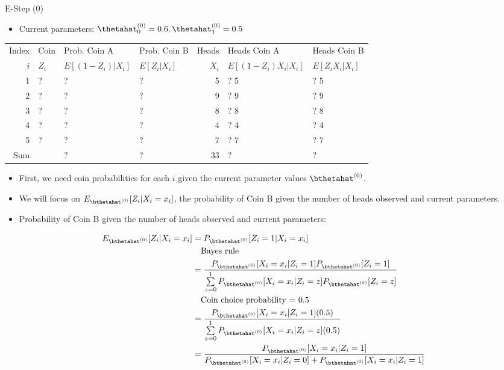 \documentclass[dvipdfmx,bigger,aspectratio=169]{beamer}
\begin{document}
\begin{frame}[fragile,allowframebreaks,label=,t]{E-Step (0)}
 \begin{itemize}
\item Current parameters: \(\thetahat_{0}^{(0)} = 0.6, \thetahat_{1}^{(0)} = 0.5\)
\end{itemize}
\footnotesize
\begin{center}
\begin{tabular}{r|l|ll|r|ll|}
Index & Coin & Prob. Coin A & Prob. Coin B & Heads & Heads Coin A & Heads Coin B\\
\(i\) & \(Z_{i}\) & \(E[(1-Z_{i})\vert X_{i}]\) & \(E[Z_{i}\vert X_{i}]\) & \(X_{i}\) & \(E[(1-Z_{i}) X_{i} \vert X_{i}]\) & \(E[Z_{i} X_{i} \vert X_{i}]\)\\
\hline
1 & ? & ? & ? & 5 & ? \texttimes{} 5 & ? \texttimes{} 5\\
2 & ? & ? & ? & 9 & ? \texttimes{} 9 & ? \texttimes{} 9\\
3 & ? & ? & ? & 8 & ? \texttimes{} 8 & ? \texttimes{} 8\\
4 & ? & ? & ? & 4 & ? \texttimes{} 4 & ? \texttimes{} 4\\
5 & ? & ? & ? & 7 & ? \texttimes{} 7 & ? \texttimes{} 7\\
\hline
Sum &  & ? & ? & 33 & ? & ?\\
\end{tabular}
\end{center}
\normalsize
\begin{itemize}
\item First, we need coin probabilities for each \(i\) given the current parameter values \(\bthetahat^{(0)}\).
\item We will focus on \(E_{\bthetahat^{(0)}}[Z_{i} | X_{i} = x_{i}]\), the probability of Coin B given the number of heads observed and current parameters.
\end{itemize}

\newpage
\begin{itemize}
\item Probability of Coin B given the number of heads observed and current parameters:
\end{itemize}
\footnotesize
\begin{align*}
  E_{\bthetahat^{(0)}}[Z_{i} | X_{i} = x_{i}] &= P_{\bthetahat^{(0)}}[Z_{i} = 1 | X_{i} = x_{i}]\\
  &~~~\text{Bayes rule}\\
  &= \frac{P_{\bthetahat^{(0)}}[X_{i} = x_{i} | Z_{i} = 1] P_{\bthetahat^{(0)}}[Z_{i} = 1]}
          {\sum\limits^{1}_{z=0} P_{\bthetahat^{(0)}}[X_{i} = x_{i} | Z_{i} = z] P_{\bthetahat^{(0)}}[Z_{i} = z]}\\
  &~~~\text{Coin choice probability = 0.5}\\
  &= \frac{P_{\bthetahat^{(0)}}[X_{i} = x_{i} | Z_{i} = 1] (0.5)}
          {\sum\limits^{1}_{z=0} P_{\bthetahat^{(0)}}[X_{i} = x_{i} | Z_{i} = z] (0.5)}\\
  &= \frac{P_{\bthetahat^{(0)}}[X_{i} = x_{i} | Z_{i} = 1]}
          {P_{\bthetahat^{(0)}}[X_{i} = x_{i} | Z_{i} = 0] + P_{\bthetahat^{(0)}}[X_{i} = x_{i} | Z_{i} = 1]}
\end{align*}
\normalsize


\end{frame}
\end{document}
